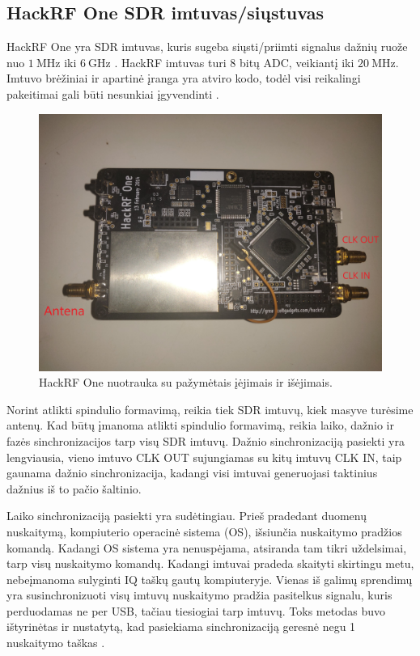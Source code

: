 \documentclass[main.tex]{subfiles}
\begin{document}
\subsection{HackRF One SDR imtuvas/siųstuvas}\label{sec:hackrf}

HackRF One yra SDR imtuvas, kuris sugeba siųsti/priimti signalus dažnių ruože nuo
$1\ \mathrm{MHz}$ iki $6\ \mathrm{GHz}$ \cite{hackrf_one}.
HackRF imtuvas turi 8 bitų ADC, veikiantį iki $20\ \mathrm{MHz}$.
Imtuvo brėžiniai ir apartinė įranga yra atviro kodo, todėl visi
reikalingi pakeitimai gali būti nesunkiai įgyvendinti \cite{hackrf_github}.

\begin{figure}[h]
    \begin{centering}
    \includegraphics[scale=0.1]{drawings/hackrf_img}
    \par\end{centering}
    \protect\caption{\label{fig:hackrf_img}HackRF One nuotrauka su pažymėtais įėjimais ir išėjimais.}
\end{figure}

Norint atlikti spindulio formavimą, reikia tiek SDR imtuvų, kiek masyve
turėsime antenų. Kad būtų įmanoma atlikti spindulio formavimą, reikia laiko, dažnio ir fazės
sinchronizacijos tarp visų SDR imtuvų.
Dažnio sinchronizaciją pasiekti yra lengviausia, vieno imtuvo CLK OUT sujungiamas su
kitų imtuvų CLK IN, taip gaunama dažnio sinchronizacija, kadangi
visi imtuvai generuojasi taktinius dažnius iš to pačio šaltinio.

Laiko sinchronizaciją pasiekti yra sudėtingiau. Prieš pradedant duomenų nuskaitymą,
kompiuterio operacinė sistema (OS), išsiunčia nuskaitymo pradžios komandą.
Kadangi OS sistema yra nenuspėjama, atsiranda tam tikri uždelsimai, tarp
visų nuskaitymo komandų. Kadangi imtuvai pradeda skaityti skirtingu metu,
nebeįmanoma sulyginti IQ taškų gautų kompiuteryje. Vienas iš galimų sprendimų
yra susinchronizuoti visų imtuvų nuskaitymo pradžia pasitelkus signalu,
kuris perduodamas ne per USB, tačiau tiesiogiai tarp imtuvų.
Toks metodas buvo ištyrinėtas ir nustatytą, kad pasiekiama sinchronizaciją
geresnė negu 1 nuskaitymo taškas \cite{hackrf_sync}.
\end{document}
